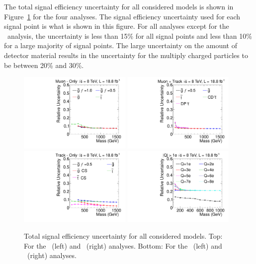 The total signal efficiency uncertainty for all considered models is shown in
Figure~\ref{fig:TotalUnc} for the four analyses. The signal efficiency uncertainty used for each signal point is what is shown in this figure.
For all analyses except for the \multi\ analysis, the uncertainty is less than 15\% for all signal points and less than 10\% for a large majority of signal points.
The large uncertainty on the amount of detector material results in the uncertainty for the multiply charged particles to be between 20\% and 30\%.

\begin{figure}[ht]
\centering
  \includegraphics[clip=false, trim=0.0cm 0cm 0.0cm 0cm, width=0.48\textwidth]{figures/muonly/MOUncertainty}
  \includegraphics[clip=false, trim=0.0cm 0cm 0.0cm 0cm, width=0.48\textwidth]{figures/tkmu/MuUncertainty}
  \includegraphics[clip=false, trim=0.0cm 0cm 0.0cm 0cm, width=0.48\textwidth]{figures/tkonly/TkUncertainty}
  \includegraphics[clip=false, trim=0.0cm 0cm 0.0cm 0cm, width=0.48\textwidth]{figures/multi/HQUncertainty}
\caption[Total signal efficiency uncertainty for all considered models]
{Total signal efficiency uncertainty for all considered models.
Top:  For the \muononly\ (left) and \tktof\ (right) analyses.
Bottom:  For the \tkonly\ (left) and \multi\ (right) analyses.}
    \label{fig:TotalUnc}
\end{figure}

